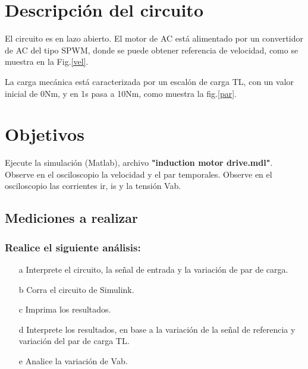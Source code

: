 \documentclass[11pt, a4paper]{article}
\begin{document}
	
\tableofcontents
\clearpage

\section{ Descripción del circuito}

El circuito es en lazo abierto.
El motor de AC está alimentado por un convertidor de AC del tipo SPWM, donde se puede obtener referencia de velocidad, como se muestra en la Fig.\ref{vel}.

La carga mecánica está caracterizada por un escalón de carga TL, con un valor inicial de 0Nm, y en 1s pasa a 10Nm, como muestra la fig.\ref{par}.


\section{Objetivos}

Ejecute la simulación (Matlab), archivo \textbf{"induction motor drive.mdl"}.\\
Observe en el osciloscopio la velocidad y el par temporales.
Observe en el osciloscopio las corrientes ir, is y la tensión Vab.


\subsection*{ Mediciones a realizar}

\subsubsection*{ Realice el siguiente análisis:}


\begin{itemize}

\item[a] Interprete el circuito, la señal de entrada y la variación de par de carga.

\item[b]  Corra el circuito de Simulink.

\item[c] Imprima los resultados.

\item[d] Interprete los resultados, en base a la variación de la señal de referencia y variación del par de carga TL.

\item[e] Analice la variación de Vab.


\end{itemize}
\end{document}

